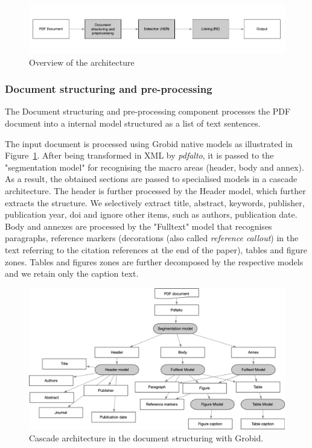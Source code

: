 \documentclass{article}
\begin{document}
\begin{figure}[ht]
\includegraphics[width=\textwidth]{overview-schema}
\caption{Overview of the architecture}
\end{figure}

\subsubsection{Document structuring and pre-processing}
\label{subsubsec:document-structuring}
The Document structuring and pre-processing component processes the PDF document into a internal model structured as a list of text sentences.

The input document is processed using Grobid native models as illustrated in Figure~\ref{fig:grobid-document-processing}. After being transformed in XML by \textit{pdfalto}, it is passed to the "segmentation model" for recognising the macro areas (header, body and annex). As a result, the obtained sections are passed to specialised models in a cascade architecture. The header is further processed by the Header model, which further extracts the structure. We selectively extract title, abstract, keywords, publisher, publication year, doi and ignore other items, such as authors, publication date. 
Body and annexes are processed by the "Fulltext" model that recognises paragraphs, reference markers (decorations (also called \textit{reference callout}) in the text referring to the citation references at the end of the paper), tables and figure zones.
Tables and figures zones are further decomposed by the respective models and we retain only the caption text. 

\begin{figure}[ht]
\label{fig:grobid-document-processing}
\includegraphics[width=\textwidth]{grobid-extraction-schema}
\caption{Cascade architecture in the document structuring with Grobid.}
\end{figure}
\end{document}
